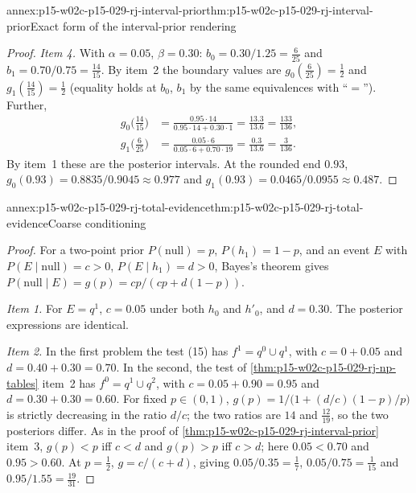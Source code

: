 \begin{annexitem}{annex:p15-w02c-p15-029-rj-interval-prior}{thm:p15-w02c-p15-029-rj-interval-prior}{Exact form of the interval-prior rendering}
\begin{proof}
\emph{Item 4.} With \(\alpha=0.05\), \(\beta=0.30\):
\(b_0=0.30/1.25=\tfrac6{25}\) and \(b_1=0.70/0.75=\tfrac{14}{15}\).
By item~2 the boundary values are \(g_0(\tfrac6{25})=\tfrac12\) and
\(g_1(\tfrac{14}{15})=\tfrac12\) (equality holds at \(b_0\), \(b_1\) by
the same equivalences with ``\(=\)''). Further,
\begin{align*}
 g_0\bigl(\tfrac{14}{15}\bigr)&=\frac{0.95\cdot14}{0.95\cdot14+0.30\cdot1}=\frac{13.3}{13.6}=\frac{133}{136},\\
 g_1\bigl(\tfrac6{25}\bigr)&=\frac{0.05\cdot6}{0.05\cdot6+0.70\cdot19}=\frac{0.3}{13.6}=\frac{3}{136}.
\end{align*}
By item~1 these are the posterior intervals. At the rounded end
\(0.93\),
\(g_0(0.93)=0.8835/0.9045\approx0.977\) and
\(g_1(0.93)=0.0465/0.0955\approx0.487\).
\end{proof}
\end{annexitem}

\begin{annexitem}{annex:p15-w02c-p15-029-rj-total-evidence}{thm:p15-w02c-p15-029-rj-total-evidence}{Coarse conditioning}
\begin{proof}
For a two-point prior \(P(\text{null})=p\), \(P(h_1)=1-p\), and an event
\(E\) with \(P(E\mid\text{null})=c>0\), \(P(E\mid h_1)=d>0\), Bayes's
theorem gives \(P(\text{null}\mid E)=g(p)=cp/(cp+d(1-p))\).

\emph{Item 1.} For \(E=q^1\), \(c=0.05\) under both \(h_0\) and
\(h'_0\), and \(d=0.30\). The posterior expressions are identical.

\emph{Item 2.} In the first problem the test (15) has
\(f^1=q^0\cup q^1\), with \(c=0+0.05\) and \(d=0.40+0.30=0.70\). In the
second, the test of \cref{thm:p15-w02c-p15-029-rj-np-tables} item~2 has
\(f^0=q^1\cup q^2\), with \(c=0.05+0.90=0.95\) and
\(d=0.30+0.30=0.60\). For fixed \(p\in(0,1)\),
\(g(p)=1/\bigl(1+(d/c)(1-p)/p\bigr)\) is strictly decreasing in the
ratio \(d/c\); the two ratios are \(14\) and \(\tfrac{12}{19}\), so the
two posteriors differ. As in the proof of
\cref{thm:p15-w02c-p15-029-rj-interval-prior} item~3, \(g(p)<p\) iff
\(c<d\) and \(g(p)>p\) iff \(c>d\); here \(0.05<0.70\) and
\(0.95>0.60\). At \(p=\tfrac12\), \(g=c/(c+d)\), giving
\(0.05/0.35=\tfrac17\), \(0.05/0.75=\tfrac1{15}\) and
\(0.95/1.55=\tfrac{19}{31}\).
\end{proof}
\end{annexitem}

